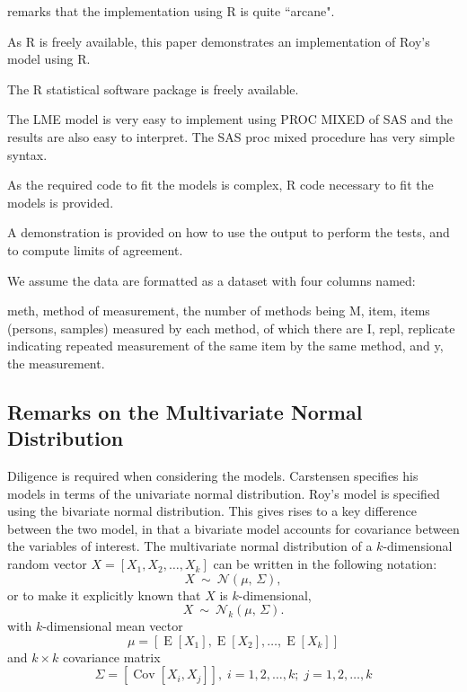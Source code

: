 \documentclass[12pt, a4paper]{article}
\begin{document}
\citet{BXC2008} remarks that the implementation using R is quite ``arcane".

As R is freely available, this paper demonstrates an implementation of Roy's model using R.

The R statistical software package is freely available.

The LME model is very easy to implement using PROC MIXED of SAS and the results are also easy to interpret.
The SAS proc mixed procedure has very simple syntax.

As the required code to fit the models is complex, R code necessary to fit the models is provided. 

A demonstration is provided on how to use the output to perform the tests, and to compute limits of agreement.



We assume the data are formatted as a dataset with four columns named:

meth, method of measurement, the number of methods being M,
item, items (persons, samples) measured by each method, of which there are I,
repl, replicate indicating repeated measurement of the same item by the same method, and
y, the measurement.









\newpage
\subsection{Remarks on the Multivariate Normal Distribution}

Diligence is required when considering the models. Carstensen specifies his models in terms of the univariate normal distribution. Roy's model is specified using the bivariate normal distribution.
This gives rises to a key difference between the two model, in that a bivariate model accounts for covariance between the variables of interest.
The multivariate normal distribution of a $k$-dimensional random vector $X = [X_1, X_2, \ldots, X_k]$
can be written in the following notation:
\[
X\ \sim\ \mathcal{N}(\mu,\, \Sigma),
\]
or to make it explicitly known that $X$ is $k$-dimensional,
\[
X\ \sim\ \mathcal{N}_k(\mu,\, \Sigma).
\]
with $k$-dimensional mean vector
\[ \mu = [ \operatorname{E}[X_1], \operatorname{E}[X_2], \ldots, \operatorname{E}[X_k]] \]
and $k \times k$ covariance matrix
\[ \Sigma = [\operatorname{Cov}[X_i, X_j]], \; i=1,2,\ldots,k; \; j=1,2,\ldots,k \]
\end{document}
